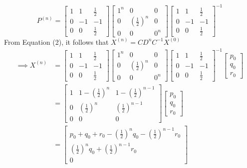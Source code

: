 \documentclass[a4paper,12pt]{article}
\begin{document}
\[
P^{(n)} = \begin{bmatrix} 1 & 1 & \frac{1}{2} \\ 0 & -1 & -1 \\ 0 & 0 & \frac{1}{2} \end{bmatrix} \begin{bmatrix} 1^n & 0 & 0 \\ 0 & \left(\frac{1}{2}\right)^n & 0 \\ 0 & 0 & 0^n \end{bmatrix} \begin{bmatrix} 1 & 1 & \frac{1}{2} \\ 0 & -1 & -1 \\ 0 & 0 & \frac{1}{2} \end{bmatrix}^{-1} 
\]
From Equation (2), it follows that
$X^{(n)} = CD^nC^{-1}X^{(0)}$\\
\begin{align}
\implies 
X^{(n)} &= \begin{bmatrix} 1 & 1 & \frac{1}{2} \\ 0 & -1 & -1 \\ 0 & 0 & \frac{1}{2} \end{bmatrix} \begin{bmatrix} 1^n & 0 & 0 \\ 0 & \left(\frac{1}{2}\right)^n & 0 \\ 0 & 0 & 0^n \end{bmatrix} \begin{bmatrix} 1 & 1 & \frac{1}{2} \\ 0 & -1 & -1 \\ 0 & 0 & \frac{1}{2} \end{bmatrix}^{-1} \begin{bmatrix} p_{0} \\ q_{0} \\ r_{0}\end{bmatrix}\nonumber\\
&=\begin{bmatrix} 1 & 1-\left(\frac{1}{2}\right)^n & 1- \left(\frac{1}{2}\right)^{n-1} \\ 0 & \left(\frac{1}{2}\right)^n & \left(\frac{1}{2}\right)^{n-1} \\ 0 & 0 & 0 \end{bmatrix} \begin{bmatrix} p_{0} \\ q_{0} \\ r_{0}\end{bmatrix}\nonumber\\
&=\begin{bmatrix}  p_{0}+q_{0}+r_{0} - \left(\frac{1}{2}\right)^nq_{0} - \left(\frac{1}{2}\right)^{n-1}r_{0}\\\left(\frac{1}{2}\right)^nq_{0} + \left(\frac{1}{2}\right)^{n-1}r_{0} \\ 0 \end{bmatrix} \tag{3}\nonumber
\end{align}
\end{document}

